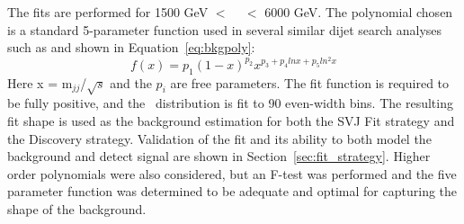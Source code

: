 The fits are performed for 1500 GeV $<$ \mt~ $<$ 6000 GeV.
The polynomial chosen is a standard 5-parameter function used in several similar dijet search analyses such as \cite{darkjets} \cite{smooth_bkg} \cite{cms_svj} and shown in Equation~\ref{eq:bkgpoly}:
\begin{equation}
f(x) = p_1(1-x)^{p_2}x^{p_3+p_4 lnx+p_5ln^2x}
\label{eq:bkgpoly}
\end{equation}
Here x = m$_{jj}$/$\sqrt{s}$ and the $p_i$ are free parameters.
The fit function is required to be fully positive, and the \mt~distribution is fit to 90 even-width bins.
The resulting fit shape is used as the background estimation for both the SVJ Fit strategy and the Discovery strategy. 
Validation of the fit and its ability to both model the background and detect signal are shown in Section~\ref{sec:fit_strategy}.
Higher order polynomials were also considered, but an F-test was performed and the five parameter function was determined to be adequate and optimal for capturing the shape of the background.






